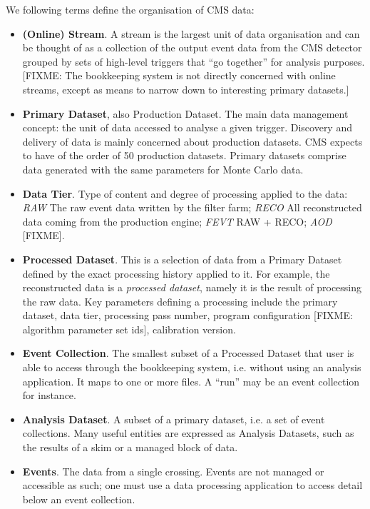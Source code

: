 \documentclass{cmspaper}
\begin{document}
We following terms define the organisation of CMS data:

\begin{itemize}
\item {\bf (Online) Stream}.  A stream is the largest unit of data organisation
and can be thought of as a collection of the output event data from the CMS
detector grouped by sets of high-level triggers that ``go together'' for
analysis purposes.  [FIXME: The bookkeeping system is not directly concerned
with online streams, except as means to narrow down to interesting primary
datasets.]

\item {\bf Primary Dataset}, also Production Dataset.  The main
data management concept: the unit of data accessed to analyse a given trigger.
Discovery and delivery of data is mainly concerned about production datasets.
CMS expects to have of the order of 50 production datasets.  Primary datasets
comprise data generated with the same parameters for Monte Carlo data.

\item {\bf Data Tier}. Type of content and degree of processing applied to the
data: {\em RAW} The raw event data written by the filter farm; {\em RECO} All
reconstructed data coming from the production engine; {\em FEVT} RAW + RECO;
{\em AOD} [FIXME].

\item {\bf Processed Dataset}. This is a selection of data from a Primary Dataset
defined by the exact processing history applied to it.  For example, the reconstructed data
is a {\em processed dataset}, namely it is the result of processing the raw data.
Key parameters defining a processing include the primary dataset, data tier,
processing pass number, program configuration [FIXME: algorithm parameter set
ids], calibration version.

\item{\bf Event Collection}. The smallest subset of a Processed Dataset that
user is able to access through the bookkeeping system, i.e. without using an
analysis application.  It maps to one or more files.  A ``run'' may be an
event collection for instance.

\item {\bf Analysis Dataset}.  A subset of a primary dataset, i.e. a set of
event collections.  Many useful entities are expressed as Analysis Datasets, 
such as the results of a skim or a managed block of data.

\item {\bf Events}.  The data from a single crossing.  Events are not managed
or accessible as such; one must use a data processing application to access
detail below an event collection.
\end{itemize}
\end{document}
